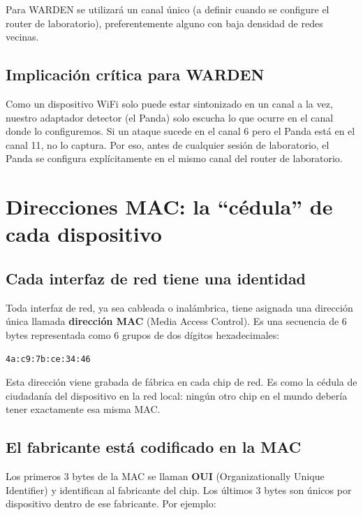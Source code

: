 \documentclass[11pt,a4paper]{article}
\begin{document}
Para WARDEN se utilizará un canal único (a definir cuando se configure el
router de laboratorio), preferentemente alguno con baja densidad de redes
vecinas.

\subsection{Implicación crítica para WARDEN}
Como un dispositivo WiFi solo puede estar sintonizado en un canal a la vez,
nuestro adaptador detector (el Panda) solo escucha lo que ocurre en el canal
donde lo configuremos. Si un ataque sucede en el canal 6 pero el Panda está
en el canal 11, no lo captura. Por eso, antes de cualquier sesión de
laboratorio, el Panda se configura explícitamente en el mismo canal del
router de laboratorio.

\section{Direcciones MAC: la ``cédula'' de cada dispositivo}

\subsection{Cada interfaz de red tiene una identidad}
Toda interfaz de red, ya sea cableada o inalámbrica, tiene asignada una
dirección única llamada \textbf{dirección MAC} (Media Access Control). Es
una secuencia de 6 bytes representada como 6 grupos de dos dígitos
hexadecimales:

\begin{verbatim}
4a:c9:7b:ce:34:46
\end{verbatim}

Esta dirección viene grabada de fábrica en cada chip de red. Es como la
cédula de ciudadanía del dispositivo en la red local: ningún otro chip en
el mundo debería tener exactamente esa misma MAC.

\subsection{El fabricante está codificado en la MAC}
Los primeros 3 bytes de la MAC se llaman \textbf{OUI} (Organizationally
Unique Identifier) y identifican al fabricante del chip. Los últimos 3
bytes son únicos por dispositivo dentro de ese fabricante. Por ejemplo:
\end{document}
